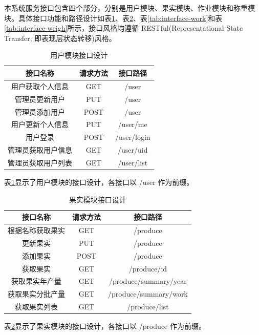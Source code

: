 本系统服务接口包含四个部分，分别是用户模块、果实模块、作业模块和称重模块。具体接口功能和路径设计如表\ref{tab:interface-user}、表\ref{tab:interface-produce}、表\ref{tab:interface-work}和表\ref{tab:interface-weigh}所示，接口风格均遵循 RESTful(Representational State Transfer, 即表现层状态转移)风格。

\begin{table}[H]
\centering
\caption{用户模块接口设计}
\label{tab:interface-user}
\begin{tabular}{|c|c|c|}
\hline
接口名称 & 请求方法 & 接口路径 \\ \hline
用户获取个人信息 & GET & /user \\ \hline
管理员更新用户 & PUT & /user \\ \hline
管理员添加用户 & POST & /user \\ \hline
用户更新个人信息 & PUT & /user/me \\ \hline
用户登录 & POST & /user/login \\ \hline
管理员获取用户信息 & GET & /user/{uid} \\ \hline
管理员获取用户列表 & GET & /user/list \\ \hline
\end{tabular}
\end{table}

表\ref{tab:interface-user}显示了用户模块的接口设计，各接口以 /user 作为前缀。

\begin{table}[H]
\centering
\caption{果实模块接口设计}
\label{tab:interface-produce}
\begin{tabular}{|c|c|c|}
\hline
接口名称 & 请求方法 & 接口路径 \\ \hline
根据名称获取果实 & GET & /produce \\ \hline
更新果实 & PUT & /produce \\ \hline
添加果实 & POST & /produce \\ \hline
获取果实 & GET & /produce/{id} \\ \hline
获取果实年产量 & GET & /produce/summary/year \\ \hline
获取果实分批产量 & GET & /produce/summary/work \\ \hline
获取果实列表 & GET & /produce/list \\ \hline
\end{tabular}
\end{table}

表\ref{tab:interface-produce}显示了果实模块的接口设计，各接口以 /produce 作为前缀。

